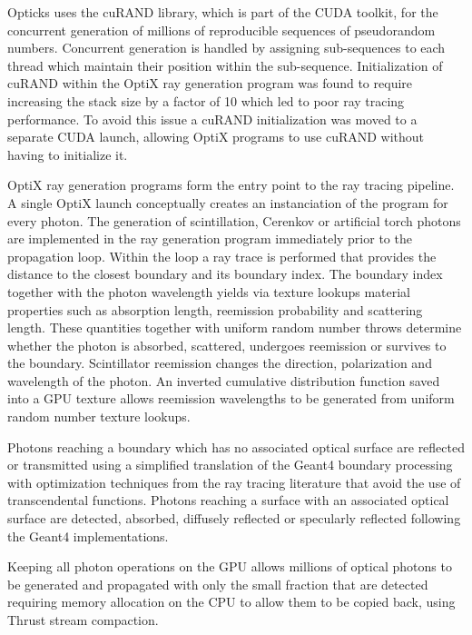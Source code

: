 \documentclass[a4paper]{jpconf}
\begin{document}
Opticks uses the cuRAND\cite{curandURL} library, which is part of the CUDA toolkit, 
for the concurrent generation of millions of reproducible sequences of pseudorandom numbers. Concurrent generation is handled by assigning 
sub-sequences to each thread which maintain their position within the sub-sequence. Initialization of cuRAND within the 
OptiX ray generation program was found to require increasing the stack size by a factor of 10 which led to 
poor ray tracing performance. To avoid this issue a cuRAND initialization was moved to a separate CUDA launch, allowing 
OptiX programs to use cuRAND without having to initialize it.

OptiX ray generation programs form the entry point to the ray tracing pipeline. 
A single OptiX launch conceptually creates an instanciation of the program for every photon. 
The generation of scintillation, Cerenkov or artificial torch photons 
are implemented in the ray generation program immediately prior to the propagation loop.
Within the loop a ray trace is performed that provides the distance to the closest boundary and its boundary index.
The boundary index together with the photon wavelength yields via texture lookups material properties 
such as absorption length, reemission probability and scattering length. 
These quantities together with uniform random number throws determine 
whether the photon is absorbed, scattered, undergoes reemission or survives to the boundary. 
Scintillator reemission changes the direction, polarization and wavelength of the photon. 
An inverted cumulative distribution function saved into a GPU texture allows reemission wavelengths 
to be generated from uniform random number texture lookups.

Photons reaching a boundary which has no associated optical surface are reflected or 
transmitted using a simplified translation of the Geant4 boundary processing 
with optimization techniques from the ray tracing literature that avoid the 
use of transcendental functions. Photons reaching a surface with an associated optical 
surface are detected, absorbed, diffusely reflected or specularly reflected following 
the Geant4 implementations. 

Keeping all photon operations on the GPU allows millions of optical photons 
to be generated and propagated with only the small fraction that are detected 
requiring memory allocation on the CPU to allow them to 
be copied back, using Thrust stream compaction.
\end{document}

